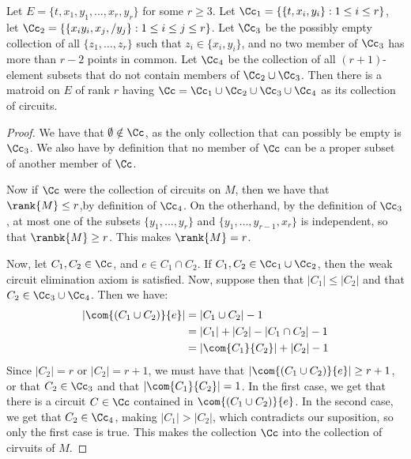 \begin{theorem}\label{1.5.7}
    Let $E=\{t,x_1,y_1, \dots, x_r,y_r\}$ for some $r \geq 3$. Let
    $\Cc_1=\{\{t,x_i,y_i\} : 1 \leq i \leq r\}$, let
    $\Cc_2=\{\{x_iy_i,x_j,/y_j\} : 1 \leq i \leq j \leq r\}$. Let $\Cc_3$ be the
    possibly empty collection of all $\{z_1, \dots, z_r\}$ such that $z_i \in
    \{x_i,y_i\}$, and no two member of $\Cc_3$ has more than $r-2$ points in
    common. Let  $\Cc_4$ be the collection of all $(r+1)$-element subsets that
    do not contain members of $\Cc_2 \cup \Cc_3$. Then there is a matroid on $E$
    of rank  $r$ having  $\Cc=\Cc_1 \cup \Cc_2 \cup \Cc_3 \cup \Cc_4$ as its
    collection of circuits.
\end{theorem}
\begin{proof}
    We have that $\emptyset \notin \Cc$, as the only collection that can
    possibly be empty is  $\Cc_3$. We also have by definition that no member of
    $\Cc$ can be a proper subset of another member of  $\Cc$.

    Now if  $\Cc$ were the collection of circuits on  $M$, then we have that
    $\rank{M} \leq r$,by definition of $\Cc_4$. On the otherhand, by the
    definition of $\Cc_3$, at most one of the subsets $\{y_1, \dots, y_r\}$ and
    $\{y_1, \dots, y_{r-1}, x_r\}$ is independent, so that $\ranbk{M} \geq r$.
    This makes $\rank{M}=r$.

    Now, let $C_1, C_2 \in \Cc$, and $e \in C_1 \cap C_2$. If $C_1,C_2 \in \Cc_1
    \cup \Cc_2$, then the weak circuit elimination axiom is satisfied. Now,
    suppose then that $|C_1| \leq |C_2|$ and that $C_2 \in \Cc_3 \cup \Cc_4$.
    Then we have:
    \begin{align*}
        |\com{(C_1 \cup C_2)}{e}|  &=   |C_1 \cup C_2|-1 \\
                                &= |C_1|+|C_2|-|C_1 \cap C_2|-1 \\
                                &= |\com{C_1}{C_2}|+|C_2|-1
    \end{align*}
Since $|C_2|=r$ or $|C_2|=r+1$, we must have that  $|\com{(C_1 \cup C_2)}{e}|
\geq r+1$, or that $C_2 \in \Cc_3$ and that $|\com{C_1}{C_2}|=1$. In the first
case, we get that there is a circuit $C \in \Cc$ contained in
$\com{(C_1 \cup C_2)}{e}$. In the second case, we get that $C_2 \in \Cc_4$,
making $|C_1|>|C_2|$, which contradicts our suposition, so only the first case
is true. This makes the collection $\Cc$ into the collection of cirvuits of
$M$.
\end{proof}


